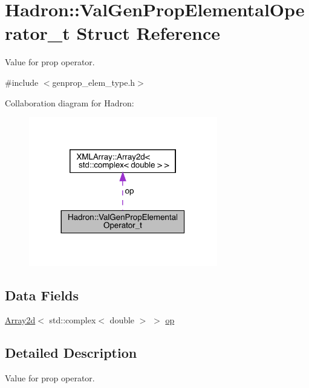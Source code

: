 \hypertarget{structHadron_1_1ValGenPropElementalOperator__t}{}\section{Hadron\+:\+:Val\+Gen\+Prop\+Elemental\+Operator\+\_\+t Struct Reference}
\label{structHadron_1_1ValGenPropElementalOperator__t}


Value for prop operator.  




{\ttfamily \#include $<$genprop\+\_\+elem\+\_\+type.\+h$>$}



Collaboration diagram for Hadron\+:\nopagebreak
\begin{figure}[H]
\begin{center}
\leavevmode
\includegraphics[width=233pt]{d1/d8c/structHadron_1_1ValGenPropElementalOperator__t__coll__graph}
\end{center}
\end{figure}
\subsection*{Data Fields}
\begin{DoxyCompactItemize}
\item 
\mbox{\hyperlink{classXMLArray_1_1Array2d}{Array2d}}$<$ std\+::complex$<$ double $>$ $>$ \mbox{\hyperlink{structHadron_1_1ValGenPropElementalOperator__t_a52ab58302100c2cdb47154082c0a3953}{op}}
\end{DoxyCompactItemize}


\subsection{Detailed Description}
Value for prop operator. 

